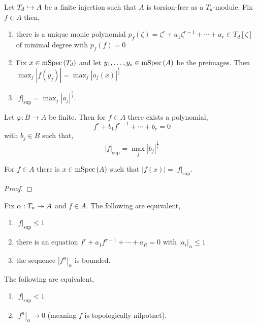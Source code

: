 \documentclass[12pt]{article}
\begin{document}
\begin{lemma}[13]
Let $T_d \hookrightarrow A$ be a finite injection such that $A$ is torsion-free as a $T_d$-module. Fix $f \in A$ then,
\begin{enumerate}
\item there is a unique monic polynomial $p_f(\zeta) = \zeta^r + a_1 \zeta^{r-1} + \cdots + a_r \in T_d[\zeta]$ of minimal degree with $p_f(f) = 0$

\item Fix $x \in \mathrm{mSpec}\left( T_d \right)$ and let $y_1, \dots, y_s \in \mathrm{mSpec}\left( A \right)$ be the preimages. Then $\max_j |f(y_j)| = \max_j |a_j(x)|^{\frac{1}{j}}$

\item $|f|_{\sup} = \max_j |a_j|^{\frac{1}{j}}$.
\end{enumerate}
\end{lemma}


\begin{lemma}[14]
Let $\varphi : B \to A$ be finite. Then for $f \in A$ there exists a polynomial,
\[ f^r + b_1 f^{r-1} + \cdots + b_r = 0 \]
with $b_j \in B$ such that,
\[ |f|_{\sup} = \max_j |b_j|^{\frac{1}{j}} \]
\end{lemma}

\begin{theorem}
For $f \in A$ there is $x \in \mathrm{mSpec}\left( A \right)$ such that $|f(x)| = |f|_{\sup}$.
\end{theorem}

\begin{proof}

\end{proof}

\begin{theorem}
Fix $\alpha : T_n \twoheadrightarrow A$ and $f \in A$. The following are equivalent,
\begin{enumerate}
\item $|f|_{\sup} \le 1$
\item there is an equation $f^r  + a_1 f^{r-1} + \cdots + a_R = 0$ with $|a_i|_{\alpha} \le 1$
\item the sequence $|f^n|_{\alpha}$ is bounded. 
\end{enumerate}
\end{theorem}


\begin{cor}
The following are equivalent,
\begin{enumerate}
\item $|f|_{\sup} < 1$
\item $|f^n|_{\alpha} \to 0$ (meaning $f$ is topologically nilpotnet).
\end{enumerate}
\end{cor}
\end{document}
